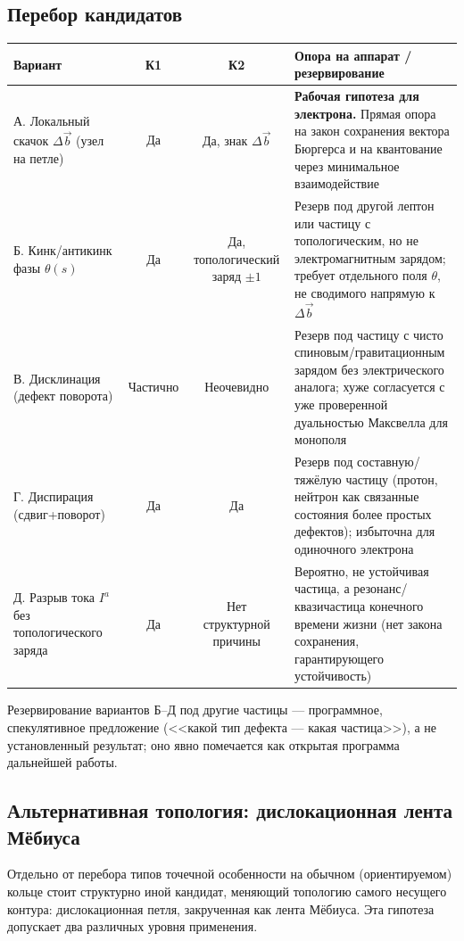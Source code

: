 \documentclass[12pt,a4paper]{article}
\begin{document}
\subsection{Перебор кандидатов}

\begin{center}
\begin{tabular}{|p{3.2cm}|c|c|p{4.5cm}|}
\hline
Вариант & К1 & К2 & Опора на аппарат / резервирование \\
\hline
А. Локальный скачок $\Delta\vec b$ (узел на петле) &
Да &
Да, знак $\Delta\vec b$ &
\textbf{Рабочая гипотеза для электрона.} Прямая опора на закон
сохранения вектора Бюргерса \cite{Lazar2010} и на квантование через
минимальное взаимодействие \cite{Braginsky2018,Braginsky2016} \\
\hline
Б. Кинк/антикинк фазы $\theta(s)$ &
Да &
Да, топологический заряд $\pm1$ &
Резерв под другой лептон или частицу с топологическим, но не
электромагнитным зарядом; требует отдельного поля $\theta$, не
сводимого напрямую к $\Delta\vec b$ \\
\hline
В. Дисклинация (дефект поворота) &
Частично &
Неочевидно &
Резерв под частицу с чисто спиновым/гравитационным зарядом без
электрического аналога; хуже согласуется с уже проверенной дуальностью
Максвелла для монополя \cite{coax_current_rings} \\
\hline
Г. Диспирация (сдвиг+поворот) &
Да &
Да &
Резерв под составную/тяжёлую частицу (протон, нейтрон как связанные
состояния более простых дефектов); избыточна для одиночного электрона \\
\hline
Д. Разрыв тока $I^a$ без топологического заряда &
Да &
Нет структурной причины &
Вероятно, не устойчивая частица, а резонанс/квазичастица конечного
времени жизни (нет закона сохранения, гарантирующего устойчивость) \\
\hline
\end{tabular}
\end{center}

Резервирование вариантов Б--Д под другие частицы --- программное,
спекулятивное предложение (<<какой тип дефекта --- какая частица>>),
а не установленный результат; оно явно помечается как открытая
программа дальнейшей работы.

\subsection{Альтернативная топология: дислокационная лента Мёбиуса}
\label{sec:mobius}

Отдельно от перебора типов точечной особенности на обычном
(ориентируемом) кольце стоит структурно иной кандидат, меняющий
топологию самого несущего контура: дислокационная петля, закрученная
как лента Мёбиуса. Эта гипотеза допускает два различных уровня
применения.
\end{document}
